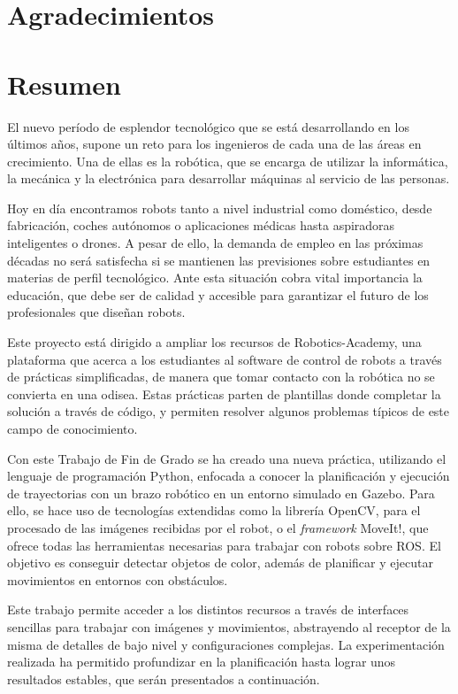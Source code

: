 \documentclass[12pt,spanish,chapterprefix, numbers=noenddot]{book}
\numberwithin{equation}{section}
\numberwithin{figure}{section}
\begin{document}
\chapter*{Agradecimientos}

\chapter*{Resumen}
El nuevo período de esplendor tecnológico que se está desarrollando en los últimos años, supone un reto para los ingenieros de cada una de las áreas en crecimiento. Una de ellas es la robótica, que se encarga de utilizar la informática, la mecánica y la electrónica para desarrollar máquinas al servicio de las personas.  %

Hoy en día encontramos robots tanto a nivel industrial como doméstico, desde fabricación, coches autónomos o aplicaciones médicas hasta aspiradoras inteligentes o drones. A pesar de ello, la demanda de empleo en las próximas décadas no será satisfecha si se mantienen las previsiones sobre estudiantes en materias de perfil tecnológico. Ante esta situación cobra vital importancia la educación, que debe ser de calidad y accesible para garantizar el futuro de los profesionales que diseñan robots. 

Este proyecto está dirigido a ampliar los recursos de Robotics-Academy, una plataforma que acerca a los estudiantes al software de control de robots a través de prácticas simplificadas, de manera que tomar contacto con la robótica no se convierta en una odisea. Estas prácticas parten de plantillas donde completar la solución a través de código, y permiten resolver algunos problemas típicos de este campo de conocimiento. 

Con este Trabajo de Fin de Grado se ha creado una nueva práctica, utilizando el lenguaje de programación Python, enfocada a conocer la planificación y ejecución de trayectorias con un brazo robótico en un entorno simulado en Gazebo. Para ello, se hace uso de tecnologías extendidas como la librería OpenCV, para el procesado de las imágenes recibidas por el robot, o el \textit{framework} MoveIt!, que ofrece todas las herramientas necesarias para trabajar con robots sobre ROS. El objetivo es conseguir detectar objetos de color, además de planificar y ejecutar movimientos en entornos con obstáculos. 

Este trabajo permite acceder a los distintos recursos a través de interfaces sencillas para trabajar con imágenes y movimientos, abstrayendo al receptor de la misma de detalles de bajo nivel y configuraciones complejas. La experimentación realizada ha permitido profundizar en la planificación hasta lograr unos resultados estables, que serán presentados a continuación.  
\end{document}
